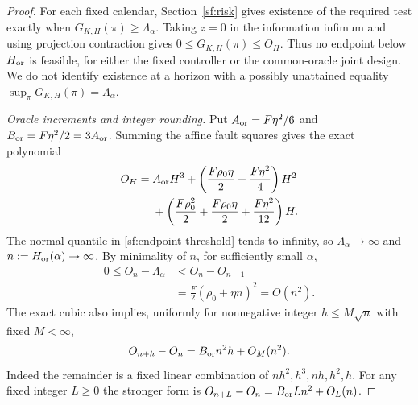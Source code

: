 \begin{proof}\leavevmode
For each fixed calendar, Section~\ref{sf:risk} gives existence of the
required test exactly when $G_{K,H}(\pi)\ge\Lambda_\alpha$.
Taking $z=0$ in the information infimum and using projection contraction
gives $0\le G_{K,H}(\pi)\le O_H$. Thus no endpoint below
$H_{\rm or}$ is feasible, for either the fixed controller or the common-oracle
joint design. We do not identify existence at a horizon with a possibly
unattained equality $\sup_\pi G_{K,H}(\pi)=\Lambda_\alpha$.

\par\smallskip\noindent\emph{Oracle increments and integer rounding.}
Put $A_{\rm or}=F\eta^2/6$ and $B_{\rm or}=F\eta^2/2=3A_{\rm or}$.
Summing the affine fault squares gives the exact polynomial
\begin{equation}\label{sf:endpoint-oracle-polynomial}
\begin{aligned}
O_H={}&A_{\rm or}H^3
 +\left(\frac{F\rho_0\eta}{2}+\frac{F\eta^2}{4}\right)H^2\\
&+\left(\frac{F\rho_0^2}{2}
 +\frac{F\rho_0\eta}{2}+\frac{F\eta^2}{12}\right)H.
\end{aligned}
\end{equation}
The normal quantile in \eqref{sf:endpoint-threshold} tends to infinity,
so $\Lambda_\alpha\to\infty$ and $n:=H_{\rm or}(\alpha)\to\infty$.
By minimality of $n$, for sufficiently small $\alpha$,
\begin{equation}\label{sf:endpoint-overshoot}
\begin{aligned}
0\le O_n-\Lambda_\alpha
 &<O_n-O_{n-1}\\
 &=\tfrac F2(\rho_0+\eta n)^2=O(n^2).
\end{aligned}
\end{equation}
The exact cubic also implies, uniformly for nonnegative integer
$h\le M\sqrt n$ with fixed $M<\infty$,
\begin{equation}\label{sf:endpoint-increment}
O_{n+h}-O_n=B_{\rm or}n^2h+O_M(n^2).
\end{equation}
Indeed the remainder is a fixed linear combination of
$nh^2,h^3,nh,h^2,h$. For any fixed integer $L\ge0$ the stronger form is
$O_{n+L}-O_n=B_{\rm or}Ln^2+O_L(n)$.


\end{proof}
